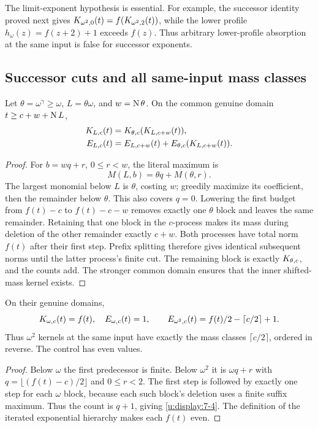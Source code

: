 The limit-exponent hypothesis is essential. For example, the successor
identity proved next gives
$K_{\omega^2,0}(t)=f(K_{\omega^2,2}(t))$, while the lower profile
$h_\omega(z)=f(z+2)+1$ exceeds $f(z)$. Thus arbitrary lower-profile
absorption at the same input is false for successor exponents.

\subsection{Successor cuts and all same-input mass classes}
\begin{lemma}\label{u:lem:successor}
Let $\theta=\omega^\gamma\ge\omega$, $L=\theta\omega$, and
$w=\operatorname{N}\theta$. On the common genuine domain $t\ge c+w+\operatorname{N} L$,
\begin{align}
 K_{L,c}(t)&=K_{\theta,c}(K_{L,c+w}(t)),              \label{u:eq:cut}\\
 E_{L,c}(t)&=E_{L,c+w}(t)
        +E_{\theta,c}(K_{L,c+w}(t)).                \label{u:eq:cocycle}
\end{align}
\end{lemma}
\begin{proof}
For $b=wq+r$, $0\le r<w$, the literal maximum is
\begin{equation}
                   M(L,b)=\theta q+M(\theta,r).      \label{u:display:7-3}
\end{equation}
The largest monomial below $L$ is $\theta$, costing $w$; greedily maximize
its coefficient, then the remainder below $\theta$. This also covers
$q=0$. Lowering the first budget from $f(t)-c$ to $f(t)-c-w$ removes
exactly one $\theta$ block and leaves the same remainder. Retaining that
one block in the $c$-process makes its mass during deletion of the other
remainder exactly $c+w$. Both processes have total norm $f(t)$ after
their first step. Prefix splitting therefore gives identical subsequent
norms until the latter process's finite cut. The remaining block is
exactly $K_{\theta,c}$, and the counts add. The stronger common domain
ensures that the inner shifted-mass kernel exists.
\end{proof}

\begin{lemma}\label{u:lem:small}
On their genuine domains,
\begin{equation}
 K_{\omega,c}(t)=f(t),\quad E_{\omega,c}(t)=1,\qquad
 E_{\omega^2,c}(t)=f(t)/2-\lceil c/2\rceil+1.         \label{u:display:7-4}
\end{equation}
Thus $\omega^2$ kernels at the same input have exactly the mass classes
$\lceil c/2\rceil$, ordered in reverse. The control has even values.
\end{lemma}
\begin{proof}
Below $\omega$ the first predecessor is finite. Below $\omega^2$ it is
$\omega q+r$ with $q=\lfloor(f(t)-c)/2\rfloor$ and $0\le r<2$.
The first step is followed by exactly one step for each $\omega$ block,
because each such block's deletion uses a finite suffix maximum. Thus
the count is $q+1$, giving \eqref{u:display:7-4}. The definition of the iterated
exponential hierarchy makes each $f(t)$ even.
\end{proof}

